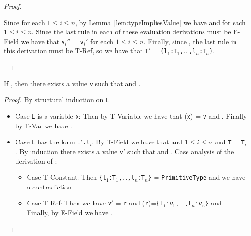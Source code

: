 \begin{proof}
\begin{itemize}
Since  for each $1
  \leq i \leq n$,  by Lemma~\ref{lem:typeImpliesValue} 
we have 
    and
   for each $1 \leq i \leq n$.
  Since the last rule in each of these evaluation derivations must be
  {\sc E-Field} we have that {\tt v$_i''$} = {\tt v$_i'$} for each $1
  \leq i \leq n$.
  Finally, since ,  the last rule in
  this derivation must be {\sc T-Ref}, so we
  have that {\tt T$'$} = {\tt  \{l$_1$:T$_1$,$\ldots$,l$_n$:T$_n$\}}.

 \end{itemize}
\end{proof}

\begin{Lemma}
\label{lem:typeImpliesValue}
If \emph{}, then there exists a value {\tt v}
such that \emph{} and \emph{}.
\end{Lemma}
\begin{proof}
By structural induction on {\tt L}:
\begin{itemize}
\item Case {\tt L} is a variable {\tt x}:  Then by {\sc T-Variable} we have
that \texttt{\Euid}(\texttt{x}) = \texttt{v} and
.  Finally by {\sc E-Var} we
have .

\item Case {\tt L} has the form {\tt L$'$.l$_i$}:  By {\sc T-Field} we
  have that 
  and $1 \leq i \leq n$ and {\tt T} = {\tt T$_i$}.  By induction there
  exists a value {\tt v$'$} such that 
  and .
  Case analysis of the derivation of
  :
  \begin{itemize}
    \item Case {\sc T-Constant}:  Then {\tt \{l$_1$:T$_1$,$\ldots$,l$_n$:T$_n$\}} = {\tt PrimitiveType}
      and we have a contradiction.
    \item Case {\sc T-Ref}:  Then we have {\tt v$'$} = {\tt r} and 
  \texttt{\Huid}(\texttt{r})=\texttt{\{l$_1$:v$_1$,$\ldots$,l$_n$:v$_n$\}}
    and
  .  Finally, by {\sc E-Field}
  we have .
   \end{itemize}
\end{itemize}
\end{proof}

